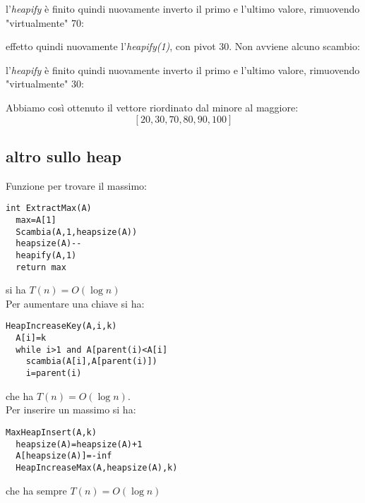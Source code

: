 \documentclass[a4paper,12pt,oneside,tikz]{book}
\begin{document}
l'\textit{heapify} è finito quindi nuovamente inverto il primo e l'ultimo valore, rimuovendo "virtualmente" 70:
\begin{center}
\end{center}
effetto quindi nuovamente l'\textit{heapify(1)}, con pivot 30. Non avviene alcuno scambio:
\begin{center}
\end{center}
l'\textit{heapify} è finito quindi nuovamente inverto il primo e l'ultimo valore, rimuovendo "virtualmente" 30:
\begin{center}
\end{center}
Abbiamo così ottenuto il vettore riordinato dal minore al maggiore:
$$[20,30,70,80,90,100]$$ 
\subsection{altro sullo heap}
Funzione per trovare il massimo:
\begin{verbatim}
int ExtractMax(A)
  max=A[1]
  Scambia(A,1,heapsize(A))
  heapsize(A)--
  heapify(A,1)
  return max
\end{verbatim}
si ha $T(n)=O(\log n)$\\
Per aumentare una chiave si ha:
\begin{verbatim}
HeapIncreaseKey(A,i,k)
  A[i]=k
  while i>1 and A[parent(i)<A[i]
    scambia(A[i],A[parent(i)])
    i=parent(i)
\end{verbatim}
che ha $T(n)=O(\log n)$.\\
Per inserire un massimo si ha:
\begin{verbatim}
MaxHeapInsert(A,k)
  heapsize(A)=heapsize(A)+1
  A[heapsize(A)]=-inf
  HeapIncreaseMax(A,heapsize(A),k)
\end{verbatim}
che ha sempre $T(n)=O(\log n)$
\end{document}
